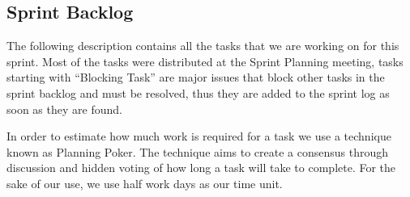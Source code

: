 \subsection{Sprint Backlog}
The following description contains all the tasks that we are working on for this sprint.
Most of the tasks were distributed at the Sprint Planning meeting, tasks starting with ``Blocking Task'' are major issues that block other tasks in the sprint backlog and must be resolved, thus they are added to the sprint log as soon as they are found.

In order to estimate how much work is required for a task we use a technique known as Planning Poker.
The technique aims to create a consensus through discussion and hidden voting of how long a task will take to complete.
For the sake of our use, we use half work days as our time unit.

